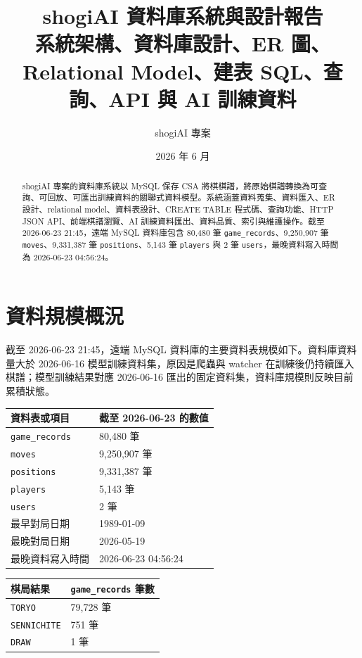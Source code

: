 \documentclass[12pt,a4paper,fontset=none]{ctexart}
\title{\textbf{shogiAI 資料庫系統與設計報告}\\
\large 系統架構、資料庫設計、ER 圖、Relational Model、建表 SQL、查詢、API 與 AI 訓練資料}
\author{shogiAI 專案}
\date{2026 年 6 月}
\begin{document}
\maketitle

\begin{abstract}
shogiAI 專案的資料庫系統以 MySQL 保存 CSA 將棋棋譜，將原始棋譜轉換為可查詢、可回放、可匯出訓練資料的關聯式資料模型。系統涵蓋資料蒐集、資料匯入、ER 設計、relational model、資料表設計、CREATE TABLE 程式碼、查詢功能、HTTP JSON API、前端棋譜瀏覽、AI 訓練資料匯出、資料品質、索引與維護操作。截至 2026-06-23 21:45，遠端 MySQL 資料庫包含 80,480 筆 \texttt{game\_records}、9,250,907 筆 \texttt{moves}、9,331,387 筆 \texttt{positions}、5,143 筆 \texttt{players} 與 2 筆 \texttt{users}，最晚資料寫入時間為 2026-06-23 04:56:24。
\end{abstract}

\tableofcontents
\newpage

\section{資料規模概況}

截至 2026-06-23 21:45，遠端 MySQL 資料庫的主要資料表規模如下。資料庫資料量大於 2026-06-16 模型訓練資料集，原因是爬蟲與 watcher 在訓練後仍持續匯入棋譜；模型訓練結果對應 2026-06-16 匯出的固定資料集，資料庫規模則反映目前累積狀態。

\begin{longtable}{p{}p{}}
\toprule
\textbf{資料表或項目} & \textbf{截至 2026-06-23 的數值}\\
\midrule
\endhead
\texttt{game\_records} & 80,480 筆\\
\texttt{moves} & 9,250,907 筆\\
\texttt{positions} & 9,331,387 筆\\
\texttt{players} & 5,143 筆\\
\texttt{users} & 2 筆\\
最早對局日期 & 1989-01-09\\
最晚對局日期 & 2026-05-19\\
最晚資料寫入時間 & 2026-06-23 04:56:24\\
\bottomrule
\end{longtable}

\begin{longtable}{p{}p{}}
\toprule
\textbf{棋局結果} & \textbf{\texttt{game\_records} 筆數}\\
\midrule
\endhead
\texttt{TORYO} & 79,728 筆\\
\texttt{SENNICHITE} & 751 筆\\
\texttt{DRAW} & 1 筆\\
\bottomrule
\end{longtable}
\end{document}
